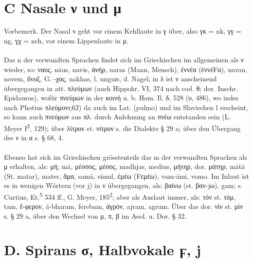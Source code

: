 \section{C Nasale ν und μ}


{\noindent\small Vorbemerk. Der Nasal ν geht vor einem Kehllaute in γ über, also γκ = nk, γγ =
ng, γχ = nch, vor einem Lippenlaute in μ.}

\paragraph{} Das n der verwandten Sprachen findet sich im Griechischen im
allgemeinen als ν wieder, so: ναυς,  nāus,  navis, ἀνήρ,  naras (Mann,
Mensch), ἐννέα (ἐννέFα),  navan,  novem, ὄνυξ, G. -χος,  nakhas, l.
unguis, d. Nagel; in λ ist ν anscheinend übergegangen in att. πλεύμων (auch
Hippokr. VI, 374 nach cod. θ; dor. Inschr. Epidauros), wofür πνεύμων in der
κοινή u. b. Hom. Il. δ, 528 (υ, 486), wo indes nach Photius πλεύμονι;62) da auch
im Lat. (pulmo) und im Slavischen l erscheint, so kann auch πνεύμων aus πλ.
durch Anlehnung an πνέω entstanden sein (L. Meyer I\textsuperscript{2}, 129);
über λίτρον st. νίτρον s. die Dialekte § 29 a; über den Übergang des ν in α s. §
68, 4. 

\paragraph{} Ebenso hat sich im Griechischen grösstenteils das m der verwandten
Sprachen als μ erhalten, als: μή,  mā, μέσσος, μέσος,  madhjas,  medius,
μήτηρ, dor. μάτηρ,  mātā (St. matar),  mater, ἅμα,  samā,  simul, ἐμέω
(Fεμέω),  vam-āmi,  vomo. Im Inlaut ist es in wenigen Wörtern (vor j) in ν
übergegangen, als: βαίνω (st. βαν-jω),  gam; s. Curtius,
Et.\textsuperscript{5} 534 ff., G. Meyer, 185\textsuperscript{2}; aber als
Auslaut immer, als: τόν st. τόμ,  tam, ἔ-φερον,  á-bharam,  ferebam,
ἀγρόν,  ajram,  agrum. Über das dor. νίν st. μίν s. § 29 a, über den
Wechsel von μ, π, β im Aeol. u. Dor. § 32.

\section*{D. Spirans σ, Halbvokale ϝ, j}


